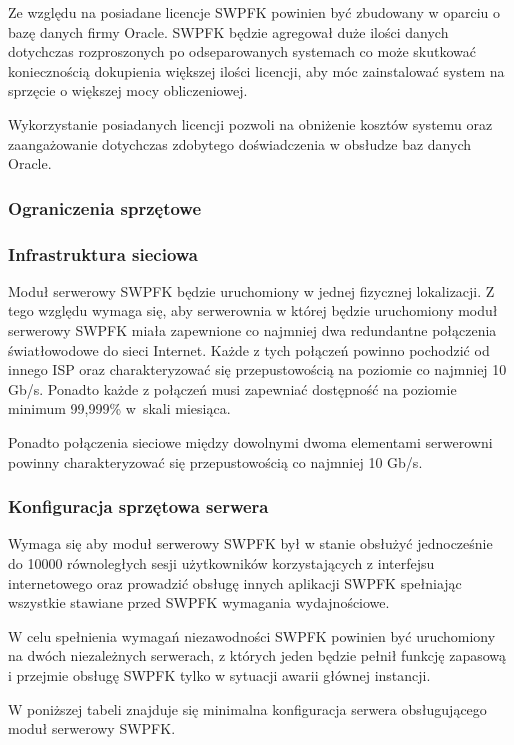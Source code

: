 Ze względu na posiadane licencje SWPFK powinien być zbudowany w oparciu o bazę danych firmy Oracle. SWPFK będzie agregował duże ilości danych dotychczas rozproszonych po odseparowanych systemach co może skutkować koniecznością dokupienia większej ilości licencji, aby móc zainstalować system na sprzęcie o większej mocy obliczeniowej.

Wykorzystanie posiadanych licencji pozwoli na obniżenie kosztów systemu oraz zaangażowanie dotychczas zdobytego doświadczenia w obsłudze baz danych Oracle.

\subsubsection{Ograniczenia sprzętowe}
\subsubsection*{Infrastruktura sieciowa}
Moduł serwerowy SWPFK będzie uruchomiony w jednej fizycznej lokalizacji. Z tego względu wymaga się, aby serwerownia w której będzie uruchomiony moduł serwerowy SWPFK miała zapewnione co najmniej dwa redundantne połączenia światłowodowe do sieci Internet. Każde z tych połączeń powinno pochodzić od innego ISP oraz charakteryzować się przepustowością na poziomie co najmniej 10 Gb/s. Ponadto każde z połączeń musi zapewniać dostępność na poziomie minimum 99,999\% w~skali miesiąca.

Ponadto połączenia sieciowe między dowolnymi dwoma elementami serwerowni powinny charakteryzować się przepustowością co najmniej 10 Gb/s.

\subsubsection*{Konfiguracja sprzętowa serwera}
Wymaga się aby moduł serwerowy SWPFK był w stanie obsłużyć jednocześnie  do 10000 równoległych sesji użytkowników korzystających z interfejsu internetowego oraz prowadzić obsługę innych aplikacji SWPFK spełniając wszystkie stawiane przed SWPFK wymagania wydajnościowe. 

W celu spełnienia wymagań niezawodności SWPFK powinien być uruchomiony na dwóch niezależnych serwerach, z których jeden będzie pełnił funkcję zapasową i przejmie obsługę SWPFK tylko w sytuacji awarii głównej instancji.

W poniższej tabeli znajduje się minimalna konfiguracja serwera obsługującego moduł serwerowy SWPFK.

